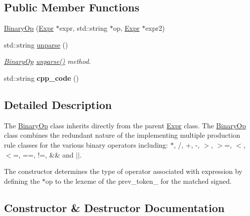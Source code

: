 \subsection*{Public Member Functions}
\begin{DoxyCompactItemize}
\item 
\hyperlink{classfcal_1_1ast_1_1BinaryOp_ad904b6af1e7ac258d9afaa1d6716df51}{Binary\+Op} (\hyperlink{classfcal_1_1ast_1_1Expr}{Expr} $\ast$expr, std\+::string $\ast$op, \hyperlink{classfcal_1_1ast_1_1Expr}{Expr} $\ast$expr2)
\item 
std\+::string \hyperlink{classfcal_1_1ast_1_1BinaryOp_a7f019bd362a138dd80450dfdafd2325a}{unparse} ()
\begin{DoxyCompactList}\small\item\em \hyperlink{classfcal_1_1ast_1_1BinaryOp}{Binary\+Op} \hyperlink{classfcal_1_1ast_1_1BinaryOp_a7f019bd362a138dd80450dfdafd2325a}{unparse()} method. \end{DoxyCompactList}\item 
std\+::string {\bfseries cpp\+\_\+code} ()\hypertarget{classfcal_1_1ast_1_1BinaryOp_a17df80baf8b6fd11dcd827941d6b424f}{}\label{classfcal_1_1ast_1_1BinaryOp_a17df80baf8b6fd11dcd827941d6b424f}

\end{DoxyCompactItemize}


\subsection{Detailed Description}
The \hyperlink{classfcal_1_1ast_1_1BinaryOp}{Binary\+Op} class inherits directly from the parent \hyperlink{classfcal_1_1ast_1_1Expr}{Expr} class. The \hyperlink{classfcal_1_1ast_1_1BinaryOp}{Binary\+Op} class combines the redundant nature of the implementing multiple production rule classes for the various binary operators including\+: $\ast$, /, +, -\/, $>$, $>$=, $<$, $<$=, ==, !=, \&\& and $\vert$$\vert$.

The constructor determines the type of operator associated with expression by defining the $\ast$op to the lexeme of the prev\+\_\+token\+\_\+ for the matched signed. 

\subsection{Constructor \& Destructor Documentation}
